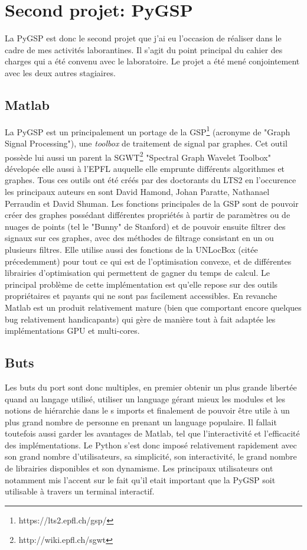 \section*{Second projet: PyGSP}

La PyGSP est donc le second projet que j'ai eu l'occasion de réaliser dans le cadre de mes activités laborantines. Il s'agit du point principal du cahier des charges qui a été convenu avec le laboratoire. Le projet a été mené conjointement avec les deux autres stagiaires.

\subsection*{Matlab}

La PyGSP est un principalement un portage de la GSP\footnote{https://lts2.epfl.ch/gsp/} (acronyme de "Graph Signal Processing"), une \emph{toolbox} de traitement de signal par graphes. Cet outil possède lui aussi un parent la SGWT\footnote{http://wiki.epfl.ch/sgwt} "Spectral Graph Wavelet Toolbox" dévelopée elle aussi à l'EPFL auquelle elle emprunte différents algorithmes et graphes. Tous ces outils ont été créés par des doctorants du LTS2 en l'occurence les principaux auteurs en sont David Hamond, Johan Paratte, Nathanael Perraudin et David Shuman. Les fonctions principales de la GSP sont de pouvoir créer des graphes possédant différentes propriétés à partir de paramètres ou de nuages de points (tel le "Bunny" de Stanford) et de pouvoir ensuite filtrer des signaux sur ces graphes, avec des méthodes de filtrage consistant en un ou plusieurs filtres. Elle utilise aussi des fonctions de la UNLocBox (citée précedemment) pour tout ce qui est de l'optimisation convexe, et de différentes librairies d'optimisation qui permettent de gagner du temps de calcul. Le principal problème de cette implémentation est qu'elle repose sur des outils propriétaires et payants qui ne sont pas facilement accessibles. En revanche Matlab est un produit relativement mature (bien que comportant encore quelques bug relativement handicapants) qui gère de manière tout à fait adaptée les implémentations GPU et multi-cores.

\subsection*{Buts}

Les buts du port sont donc multiples, en premier obtenir un plus grande libertée quand au langage utilisé, utiliser un language gérant mieux les modules et les notions de hiérarchie dans le s imports et finalement de pouvoir être utile à un plus grand nombre de personne en prenant un language populaire.
Il fallait toutefois aussi garder les avantages de Matlab, tel que l'interactivité et l'efficacité des implémentations.
Le Python s'est donc imposé relativement rapidement avec son grand nombre d'utilisateurs, sa simplicité, son interactivité, le grand nombre de librairies disponibles et son dynamisme.
Les principaux utilisateurs ont notamment mis l'accent sur le fait qu'il etait important que la PyGSP soit utilisable à travers un terminal interactif.

